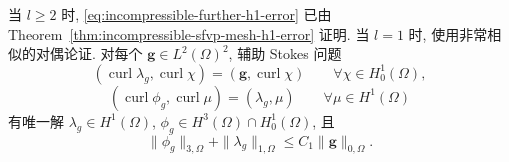 \begin{Proof}
当 $l\geq2$ 时,
\eqref{eq:incompressible-further-h1-error}
已由 Theorem~\ref{thm:incompressible-sfvp-mesh-h1-error} 证明.
当 $l=1$ 时, 使用非常相似的对偶论证.
对每个 $\mathbf g\in L^2(\Omega)^2$, 辅助 Stokes 问题
\[
(\operatorname{curl}\lambda_g,\operatorname{curl}\chi)
=(\mathbf g,\operatorname{curl}\chi)
\qquad\forall\chi\in H_0^1(\Omega),
\]
\[
(\operatorname{curl}\phi_g,\operatorname{curl}\mu)
=(\lambda_g,\mu)
\qquad\forall\mu\in H^1(\Omega)
\]
有唯一解 $\lambda_g\in H^1(\Omega)$,
$\phi_g\in H^3(\Omega)\cap H_0^1(\Omega)$, 且
\begin{equation}\label{eq:incompressible-further-dual-regularity}
\|\phi_g\|_{3,\Omega}+\|\lambda_g\|_{1,\Omega}
\leq C_1\|\mathbf g\|_{0,\Omega}.
\end{equation}


\end{Proof}
